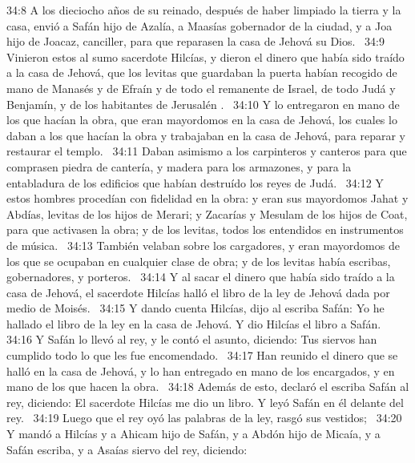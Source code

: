 																																		34:8 A los dieciocho años de su reinado, después de haber limpiado la tierra y la casa, envió a Safán hijo de Azalía, a Maasías gobernador de la ciudad, y a Joa hijo de Joacaz, canciller, para que reparasen la casa de Jehová su Dios.  
																																		34:9 Vinieron estos al sumo sacerdote Hilcías, y dieron el dinero que había sido traído a la casa de Jehová, que los levitas que guardaban la puerta habían recogido de mano de Manasés y de Efraín y de todo el remanente de Israel, de todo Judá y Benjamín, y de los habitantes de Jerusalén .  
																																		34:10 Y lo entregaron en mano de los que hacían la obra, que eran mayordomos en la casa de Jehová, los cuales lo daban a los que hacían la obra y trabajaban en la casa de Jehová, para reparar y restaurar el templo.  
																																		34:11 Daban asimismo a los carpinteros y canteros para que comprasen piedra de cantería, y madera para los armazones, y para la entabladura de los edificios que habían destruído los reyes de Judá.  
																																		34:12 Y estos hombres procedían con fidelidad en la obra: y eran sus mayordomos Jahat y Abdías, levitas de los hijos de Merari; y Zacarías y Mesulam de los hijos de Coat, para que activasen la obra; y de los levitas, todos los entendidos en instrumentos de música.  
																																		34:13 También velaban sobre los cargadores, y eran mayordomos de los que se ocupaban en cualquier clase de obra; y de los levitas había escribas, gobernadores, y porteros.  
																																		34:14 Y al sacar el dinero que había sido traído a la casa de Jehová, el sacerdote Hilcías halló el libro de la ley de Jehová dada por medio de Moisés.  
																																		34:15 Y dando cuenta Hilcías, dijo al escriba Safán: Yo he hallado el libro de la ley en la casa de Jehová. Y dio Hilcías el libro a Safán.  
																																		34:16 Y Safán lo llevó al rey, y le contó el asunto, diciendo: Tus siervos han cumplido todo lo que les fue encomendado.  
																																		34:17 Han reunido el dinero que se halló en la casa de Jehová, y lo han entregado en mano de los encargados, y en mano de los que hacen la obra.  
																																		34:18 Además de esto, declaró el escriba Safán al rey, diciendo: El sacerdote Hilcías me dio un libro. Y leyó Safán en él delante del rey.  
																																		34:19 Luego que el rey oyó las palabras de la ley, rasgó sus vestidos;  
																																		34:20 Y mandó a Hilcías y a Ahicam hijo de Safán, y a Abdón hijo de Micaía, y a Safán escriba, y a Asaías siervo del rey, diciendo:  
